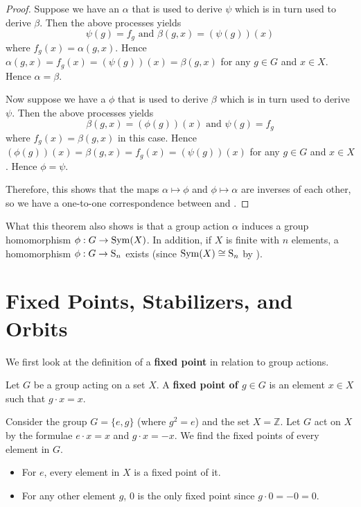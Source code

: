 \begin{proof}
    Suppose we have an $\alpha$ that is used to derive $\psi$ which is in turn used to derive $\beta$. Then the above processes yields
    \[
        \psi(g) = f_g \text{ and } \beta(g, x) = (\psi(g))(x)
    \]
    where $f_g(x) = \alpha(g, x)$. Hence $\alpha(g, x) = f_g(x) = (\psi(g))(x) = \beta(g, x)$ for any $g \in G$ and $x \in X$. Hence $\alpha = \beta$.

    Now suppose we have a $\phi$ that is used to derive $\beta$ which is in turn used to derive $\psi$. Then the above processes yields
    \[
        \beta(g, x) = (\phi(g))(x) \text{ and } \psi(g) = f_g
    \]
    where $f_g(x) = \beta(g, x)$ in this case. Hence $(\phi(g))(x) = \beta(g, x) = f_g(x) = (\psi(g))(x)$ for any $g \in G$ and $x \in X$. Hence $\phi = \psi$.

    Therefore, this shows that the maps $\alpha \mapsto \phi$ and $\phi \mapsto \alpha$ are inverses of each other, so we have a one-to-one correspondence between  and .
\end{proof}
\begin{remark}
    What this theorem also shows is that a group action $\alpha$ induces a group homomorphism $\phi: G \to \mathrm{Sym}(X)$. In addition, if $X$ is finite with $n$ elements, a homomorphism $\phi: G \to \mathrm{S}_{n}$ exists (since $\mathrm{Sym}(X) \cong \mathrm{S}_{n}$ by ).
\end{remark}

\section{Fixed Points, Stabilizers, and Orbits}
We first look at the definition of a \textbf{fixed point} in relation to group actions.

\begin{definition}
    Let $G$ be a group acting on a set $X$. A \textbf{fixed point of $g \in G$} is an element $x \in X$ such that $g\cdot x = x$.
\end{definition}

\begin{example}
    Consider the group $G = \{e, g\}$ (where $g^2 = e$) and the set $X = \mathbb{Z}$. Let $G$ act on $X$ by the formulae $e\cdot x = x$ and $g\cdot x = -x$. We find the fixed points of every element in $G$.
    \begin{itemize}
        \item For $e$, every element in $X$ is a fixed point of it.
        \item For any other element $g$, 0 is the only fixed point since $g\cdot 0 = -0 = 0$.
    \end{itemize}
\end{example}

